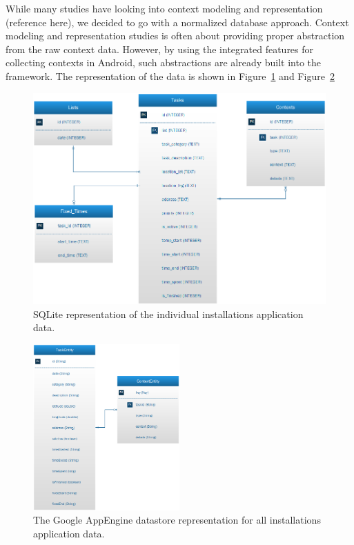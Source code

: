 While many studies have looking into context modeling and representation (reference here), we decided to go with a normalized database approach. Context modeling and representation studies is often about providing proper abstraction from the raw context data. However, by using the integrated features for collecting contexts in Android, such abstractions are already built into the framework. The representation of the data is shown in Figure~\ref{fig:databasemodel} and Figure~\ref{fig:databasemodelexternal}

\begin{figure}[tbp]
  \centering
  \includegraphics[width=\textwidth]{figures/DatabaseModel.png}
  \caption[Database model]{SQLite representation of the individual installations application data.}
  \label{fig:databasemodel}
\end{figure}

\begin{figure}[tbp]
  \centering
  \includegraphics[width=0.5\textwidth]{figures/DatabaseModel_external.png}
  \caption[External database model]{The Google AppEngine datastore representation for all installations application data.}
  \label{fig:databasemodelexternal}
\end{figure}




